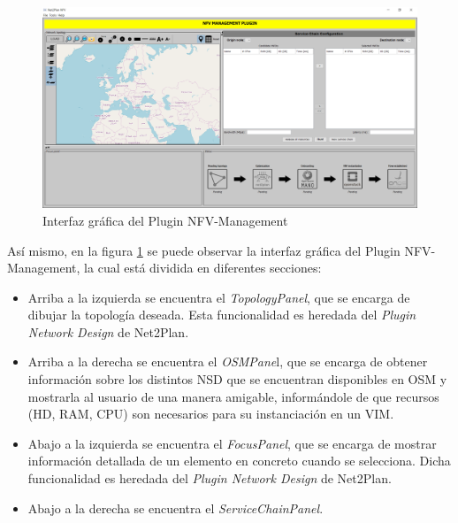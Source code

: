 \begin{figure}[!ht]
	\centering
	\includegraphics[width=0.8\linewidth]{imagenes/nfvplugin_dashboard}
	\caption{Interfaz gráfica del Plugin NFV-Management}
	\label{fig:nfvplugindash}
\end{figure}

Así mismo, en la figura \ref{fig:nfvplugindash} se puede observar la interfaz gráfica del Plugin NFV-Management, la cual está dividida en diferentes secciones:

\begin{itemize}
	\item Arriba a la izquierda se encuentra el \textit{TopologyPanel}, que se encarga de dibujar la topología deseada. Esta funcionalidad es heredada del \textit{Plugin Network Design} de Net2Plan.
	
	\item Arriba a la derecha se encuentra el \textit{OSMPane}l, que se encarga de obtener información sobre los distintos NSD que se encuentran disponibles en OSM y mostrarla al usuario de una manera amigable, informándole de que recursos (HD, RAM, CPU) son necesarios para su instanciación en un VIM.
	
	\item Abajo a la izquierda se encuentra el \textit{FocusPanel}, que se encarga de mostrar información detallada de un elemento en concreto cuando se selecciona. Dicha funcionalidad es heredada del \textit{Plugin Network Design} de Net2Plan.
	
	\item Abajo a la derecha se encuentra el \textit{ServiceChainPanel}.
\end{itemize}




\cleardoublepage